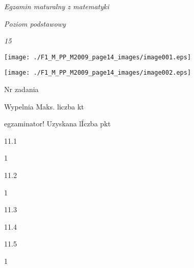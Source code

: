 \documentclass[a4paper,12pt]{article}
\begin{document}
{\it Egzamin maturalny z matematyki}

{\it Poziom podstawowy}

{\it 15}
\begin{center}
\texttt{[image: ./F1\_M\_PP\_M2009\_page14\_images/image001.eps]}

\texttt{[image: ./F1\_M\_PP\_M2009\_page14\_images/image002.eps]}
\end{center}
Nr zadania

Wypelnia Maks. liczba kt

egzaminator! Uzyskana lÍczba pkt

11.1

1

11.2

1

11.3

11.4

11.5

1
\end{document}
